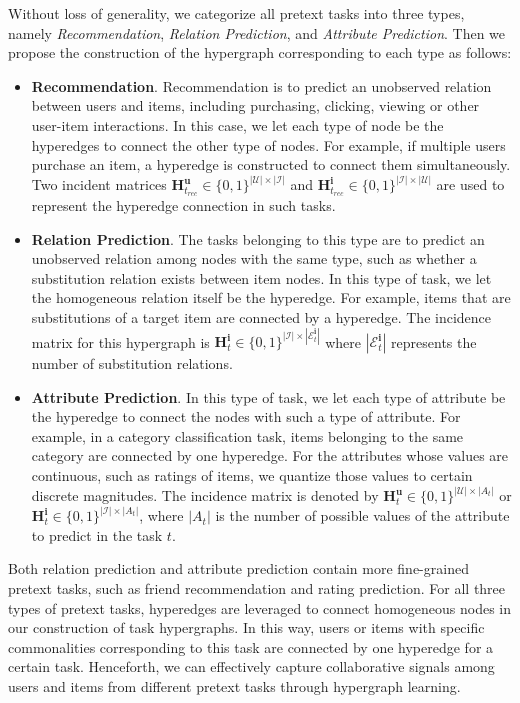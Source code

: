 Without loss of generality, we categorize all pretext tasks into three types, namely \textit{Recommendation}, \textit{Relation Prediction}, and \textit{Attribute Prediction}. Then we propose the construction of the hypergraph corresponding to each type as follows:
\begin{itemize}
    \item \textbf{Recommendation}. Recommendation is to predict an unobserved relation between users and items, including purchasing, clicking, viewing or other user-item interactions. In this case, we let each type of node be the hyperedges to connect the other type of nodes. For example, if multiple users purchase an item, a hyperedge is constructed to connect them simultaneously. Two incident matrices $\mathbf{H}^{\mathbf{u}}_{t_{rec}}\in\{0,1\}^{|\mathcal{U}|\times|\mathcal{I}|}$ and $\mathbf{H}^{\mathbf{i}}_{t_{rec}}\in\{0,1\}^{|\mathcal{I}|\times|\mathcal{U}|}$ are used to represent the hyperedge connection in such tasks.
    \item \textbf{Relation Prediction}. The tasks belonging to this type are to predict an unobserved relation among nodes with the same type, such as whether a substitution relation exists between item nodes. In this type of task, we let the homogeneous relation itself be the hyperedge. For example, items that are substitutions of a target item are connected by a hyperedge. The incidence matrix for this hypergraph is $\mathbf{H}^{\mathbf{i}}_{t}\in\{0,1\}^{|\mathcal{I}|\times|\mathcal{E}^{\mathbf{i}}_{t}|}$ where $|\mathcal{E}^{\mathbf{i}}_{t}|$ represents the number of substitution relations.
    \item \textbf{Attribute Prediction}. In this type of task, we let each type of attribute be the hyperedge to connect the nodes with such a type of attribute. For example, in a category classification task, items belonging to the same category are connected by one hyperedge. For the attributes whose values are continuous, such as ratings of items, we quantize those values to certain discrete magnitudes. The incidence matrix is denoted by $\mathbf{H}^{\mathbf{u}}_{t}\in\{0,1\}^{|\mathcal{U}|\times|A_t|}$ or $\mathbf{H}^{\mathbf{i}}_{t}\in\{0,1\}^{|\mathcal{I}|\times|A_t|}$, where $|A_t|$ is the number of possible values of the attribute to predict in the task $t$.
\end{itemize}
Both relation prediction and attribute prediction contain more fine-grained pretext tasks, such as friend recommendation and rating prediction.
For all three types of pretext tasks, hyperedges are leveraged to connect homogeneous nodes in our construction of task hypergraphs. In this way, users or items with specific commonalities corresponding to this task are connected by one hyperedge for a certain task. Henceforth, we can effectively capture collaborative signals among users and items from different pretext tasks through hypergraph learning.


